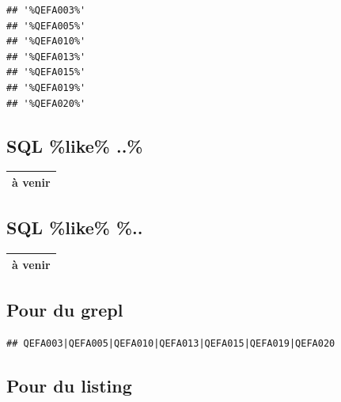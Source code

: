 \documentclass[]{book}
\newenvironment{Shaded}{\begin{snugshade}}{\end{snugshade}}
\newcommand{\DataTypeTok}[1]{\textcolor[rgb]{0.13,0.29,0.53}{#1}}
\newcommand{\KeywordTok}[1]{\textcolor[rgb]{0.13,0.29,0.53}{\textbf{#1}}}
\newcommand{\NormalTok}[1]{#1}
\newcommand{\OperatorTok}[1]{\textcolor[rgb]{0.81,0.36,0.00}{\textbf{#1}}}
\newcommand{\StringTok}[1]{\textcolor[rgb]{0.31,0.60,0.02}{#1}}
\begin{document}
\begin{verbatim}
## '%QEFA003%'
## '%QEFA005%'
## '%QEFA010%'
## '%QEFA013%'
## '%QEFA015%'
## '%QEFA019%'
## '%QEFA020%'
\end{verbatim}

\hypertarget{sql-like-..}{%
\subsection{SQL \%like\% ..\%}\label{sql-like-..}}

\begin{longtable}[]{@{}l@{}}
\toprule
\endhead
à venir\tabularnewline
\bottomrule
\end{longtable}

\hypertarget{sql-like-..-1}{%
\subsection{SQL \%like\% \%..}\label{sql-like-..-1}}

\begin{longtable}[]{@{}l@{}}
\toprule
\endhead
à venir\tabularnewline
\bottomrule
\end{longtable}

\hypertarget{pour-du-grepl}{%
\subsection{Pour du grepl}\label{pour-du-grepl}}

\begin{Shaded}
\end{Shaded}

\begin{verbatim}
## QEFA003|QEFA005|QEFA010|QEFA013|QEFA015|QEFA019|QEFA020
\end{verbatim}

\hypertarget{pour-du-listing}{%
\subsection{Pour du listing}\label{pour-du-listing}}
\end{document}
